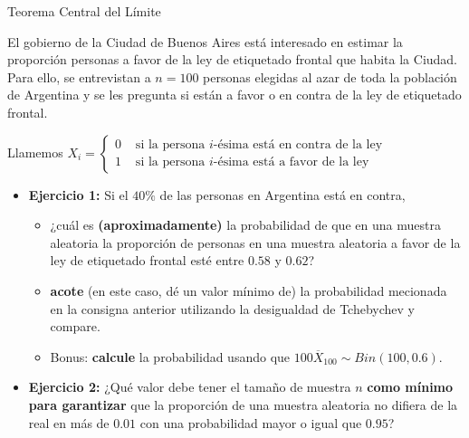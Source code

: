 \documentclass{beamer}
\theoremstyle{definition}
\begin{document}
\begin{frame}{\color{rosee}Teorema Central del L\'imite} \small

  El gobierno de la Ciudad de Buenos Aires est\'a interesado en estimar
  la proporci\'on personas a favor de la ley de etiquetado frontal que habita la Ciudad. Para ello, se entrevistan a $n=100$ personas elegidas al azar de toda
      la poblaci\'{o}n de Argentina y se les pregunta si est\'{a}n a
      favor o en contra de la ley de etiquetado frontal.

        \medskip
  
  Llamemos $X_i=\begin{cases} 0 & \text{ si la persona $i$-\'esima está en contra de la ley}\\ 
   1 & \text{ si la persona $i$-\'esima está a favor de la ley} \end{cases}$
  
  \medskip

    \begin{itemize}[leftmargin=*]

    \item \textbf{Ejercicio 1:} Si el $40\%$ de las personas en Argentina est\'a en contra,
      \begin{itemize}[leftmargin=*]
          
     \item  ¿cu\'{a}l es \textbf{(aproximadamente)} la probabilidad de que en una muestra aleatoria la
      proporci\'{o}n de personas en una muestra aleatoria a favor de la ley de etiquetado frontal %
      est\'{e} entre $0.58$ y $0.62$?
      \item \textbf{acote }(en este caso, dé un valor mínimo de) la probabilidad mecionada en la consigna anterior utilizando la desigualdad de Tchebychev y compare.
      \item Bonus: \textbf{calcule} la probabilidad usando que $100\overline{X}_{100}\sim Bin(100,0.6)$.
    \end{itemize}
    \item \textbf{Ejercicio 2:} ¿Qu\'e valor debe tener el tamaño de muestra $n$ \textbf{como mínimo para garantizar}
  que la proporci\'on de una muestra aleatoria no difiera de la real en m\'as de $0.01$ con una
  probabilidad mayor o igual que $0.95$?
    \end{itemize}
  
\end{frame}
\end{document}
